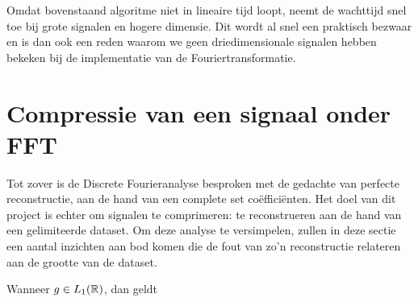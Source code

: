 \begin{opmerking}
Omdat bovenstaand algoritme niet in lineaire tijd loopt, neemt de wachttijd snel toe bij grote signalen en hogere dimensie. 
Dit wordt al snel een praktisch bezwaar en is dan ook een reden waarom we geen driedimensionale 
signalen hebben bekeken bij de implementatie van de Fouriertransformatie.
\end{opmerking}

\section{Compressie van een signaal onder FFT}
\label{daling_FFT}
Tot zover is de Discrete Fourieranalyse besproken met de gedachte van perfecte reconstructie,
aan de hand van een complete set co\"effici\"enten. Het doel van dit project is echter om
signalen te comprimeren: te reconstrueren aan de hand van een gelimiteerde dataset.
Om deze analyse te versimpelen, zullen in deze sectie een aantal inzichten aan bod komen die
de fout van zo'n reconstructie relateren aan de grootte van de dataset.

\iffalse
We zullen het convergentiegedrag gaan bepalen van de Fouriertransformatie voor functies die $C^k$ zijn.
We weten immers dat voor differentieerbare functies de Fourieranalyse perfect reconstrueerbaar is.
Met het convergentie gedrag van deze functies kunnen we dan kwantificeren hoe goed een functie te 
benaderen is met een eindige subset van de Fourier-getransformeerde.
We trachten daarom te bewijzen dat er een algebra\"isch verband bestaat tussen de fout en de frequentie
van de wavelets en bovendien een exponentieel verband tussen de fout en de `gladheid' van de functie.
\fi

\begin{lemm}
\label{lebbie}
Wanneer $g \in L_1(\mathbb{R})$, dan geldt 
\end{lemm}

